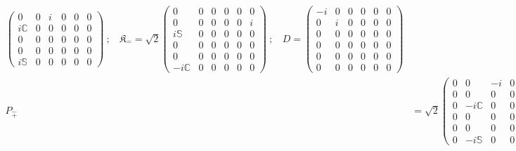 \documentclass[]{article}
\numberwithin{equation}{section}
\begin{document}
{{\begin{align}
\begin{pmatrix}
        0&0&i&0&0&0\\
        i\mathbb{C}&0&0&0&0&0\\
        0&0&0&0&0&0\\
        0&0&0&0&0&0\\
        i\mathbb{S}&0&0&0&0&0
    \end{pmatrix}~;~~~~\mathfrak{K}_{\hat{-}}=\sqrt{2}\begin{pmatrix}
        0&0&0&0&0&0\\
        0&0&0&0&0&i\\
        i\mathbb{S}&0&0&0&0&0\\
        0&0&0&0&0&0\\
        0&0&0&0&0&0\\
        -i\mathbb{C}&0&0&0&0&0
    \end{pmatrix}~;~~~~D=\begin{pmatrix}
        -i&0&0&0&0&0\\
        0&i&0&0&0&0\\
        0&0&0&0&0&0\\
        0&0&0&0&0&0\\
        0&0&0&0&0&0\\
        0&0&0&0&0&0
    \end{pmatrix}\nonumber\\
    P_{\hat{+}}&=\sqrt{2}\begin{pmatrix}
        0&0&-i&0&0&0\\
        0&0&0&0&0&0\\
        0&-i\mathbb{C}&0&0&0&0\\
        0&0&0&0&0&0\\
        0&0&0&0&0&0\\
        0&-i\mathbb{S}&0&0&0&0
    \end{pmatrix}~;~~~~~~~~P_{\hat{-}}=\sqrt{2}\begin{pmatrix}
        0&0&0&0&0&-i\\
        0&0&0&0&0&0\\
        0&-i\mathbb{S}&0&0&0&0\\
        0&0&0&0&0&0\\
        0&0&0&0&0&0\\
        0&i\mathbb{C}&0&0&0&0
    \end{pmatrix}~;~~~~~~K^{3}=\begin{pmatrix}
        0&0&0&0&0&0\\
        0&0&0&0&0&0\\
        0&0&-i\mathbb{S}&0&0&i\mathbb{C}\\

\end{pmatrix}
\end{align}}}
\end{document}
